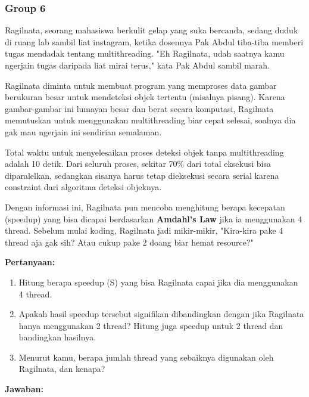 \documentclass[12pt]{article}
\begin{document}
\subsubsection{Group 6}

Ragilnata, seorang mahasiswa berkulit gelap yang suka bercanda, sedang duduk di ruang lab sambil liat instagram, ketika dosennya Pak Abdul tiba-tiba memberi tugas mendadak tentang multithreading. "Eh Ragilnata, udah saatnya kamu ngerjain tugas daripada liat mirai terus," kata Pak Abdul sambil marah.

Ragilnata diminta untuk membuat program yang memproses data gambar berukuran besar untuk mendeteksi objek tertentu (misalnya pisang). Karena gambar-gambar ini lumayan besar dan berat secara komputasi, Ragilnata memutuskan untuk menggunakan multithreading biar cepat selesai, soalnya dia gak mau ngerjain ini sendirian semalaman.

Total waktu untuk menyelesaikan proses deteksi objek tanpa multithreading adalah 10 detik. Dari seluruh proses, sekitar 70\% dari total eksekusi bisa diparalelkan, sedangkan sisanya harus tetap dieksekusi secara serial karena constraint dari algoritma deteksi objeknya.

Dengan informasi ini, Ragilnata pun mencoba menghitung berapa kecepatan (speedup) yang bisa dicapai berdasarkan \textbf{Amdahl’s Law} jika ia menggunakan 4 thread. Sebelum mulai koding, Ragilnata jadi mikir-mikir, "Kira-kira pake 4 thread aja gak sih? Atau cukup pake 2 doang biar hemat resource?"

\textbf{Pertanyaan:}
\begin{enumerate}
    \item Hitung berapa speedup (S) yang bisa Ragilnata capai jika dia menggunakan 4 thread.
    \item Apakah hasil speedup tersebut signifikan dibandingkan dengan jika Ragilnata hanya menggunakan 2 thread? Hitung juga speedup untuk 2 thread dan bandingkan hasilnya.
    \item Menurut kamu, berapa jumlah thread yang sebaiknya digunakan oleh Ragilnata, dan kenapa?
\end{enumerate}

\textbf{Jawaban:}
\end{document}
